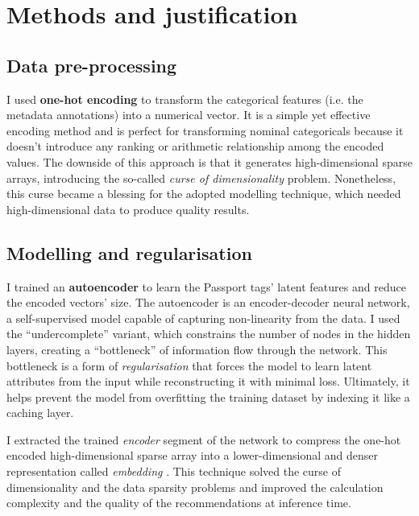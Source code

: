 
\section{Methods and justification}

\subsection{Data pre-processing}

I used \textbf{one-hot encoding} to transform the categorical features (i.e. the metadata annotations) into a numerical vector.
It is a simple yet effective encoding method and is perfect for transforming nominal categoricals because it doesn’t introduce
any ranking or arithmetic relationship among the encoded values.
The downside of this approach is that it generates high-dimensional sparse arrays,
introducing the so-called \textit{curse of dimensionality} problem.
Nonetheless, this curse became a blessing for the adopted modelling technique,
which needed high-dimensional data to produce quality results.



\subsection{Modelling and regularisation}

I trained an \textbf{autoencoder} \cite{DBLP:journals/corr/abs-2003-05991,DBLP:journals/corr/abs-2201-03898}
to learn the Passport tags' latent features and reduce the encoded vectors' size.
The autoencoder is an encoder-decoder neural network, a self-supervised model capable of capturing non-linearity from the data.
I used the ``undercomplete'' variant, which constrains the number of nodes in the hidden layers, creating a ``bottleneck''
of information flow through the network.
This bottleneck is a form of \textit{regularisation} that forces the model to learn latent attributes from the input
while reconstructing it with minimal loss. Ultimately, it helps prevent the model from overfitting the training dataset by indexing it like a caching layer.

I extracted the trained \textit{encoder} segment of the network to compress the one-hot encoded high-dimensional sparse array into
a lower-dimensional and denser representation called \textit{embedding} \cite{GoogleForDevelopers:Embeddings}.
This technique solved the curse of dimensionality and the data sparsity problems and improved the calculation
complexity and the quality of the recommendations at inference time.

